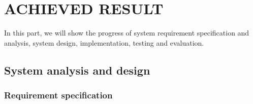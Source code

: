 \chapter{ACHIEVED RESULT}
\label{ch:chap3}
In this part, we will show the progress of system requirement specification and analysis, system design, implementation, testing and evaluation.

\section{System analysis and design}
\subsection{Requirement specification}
